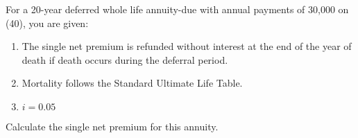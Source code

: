 For a 20-year deferred whole life annuity-due with annual payments of 30,000 on (40), you are given:
\begin{enumerate}
\item The single net premium is refunded without interest at the end of the year of death if death occurs during the deferral period.
\item Mortality follows the Standard Ultimate Life Table.
\item $i=0.05$
\end{enumerate}
Calculate the single net premium for this annuity.
